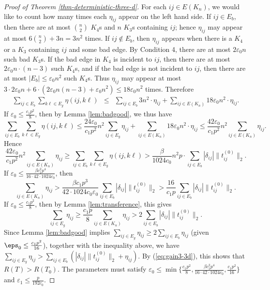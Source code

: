 \begin{proof}[Proof of Theorem \ref{thm-deterministic-three-d}]
For each $ij\in E(K_{n})$, we would like to count how many times
each $\eta_{ij}$ appear on the left hand side. If $ij\in E_{b}$,
then there are at most ${n \choose 2}$ $K_{4}$s and $n$ $K_{3}$s
containing $ij$; hence $\eta_{ij}$ may appear at most $6{n \choose 2}+3n=3n^{2}$
times. If $ij\notin E_{b}$, then $\eta_{ij}$ appears when there
is a $K_{4}$ or a $K_{3}$ containing $ij$ and some bad edge. By
Condition 4, there are at most $2\varepsilon_{0}n$ such bad $K_{3}$s.
If the bad edge in $K_{4}$ is incident to $ij$, then there are at
most $2\varepsilon_{0}n\cdot(n-3)$ such $K_{4}$s, and if the bad
edge is not incident to $ij$, then there are at most $|E_{b}|\le\varepsilon_{0}n^{2}$
such $K_{4}$s. Thus $\eta_{ij}$ may appear at most $3\cdot2\varepsilon_{0}n+6\cdot(2\varepsilon_{0}n(n-3)+\varepsilon_{0}n^{2})\le18\varepsilon_{0}n^{2}$
times. Therefore
\begin{eqnarray*}
\sum_{ij\in E_{b}}\sum_{k\ell\in E_{g}}\eta(ij,k\ell) & \le & \sum_{ij\in E_{b}}3n^{2}\cdot\eta_{ij}+\sum_{ij\in E(K_{n})}18\varepsilon_{0}n^{2}\cdot\eta_{ij}.
\end{eqnarray*}
If $\varepsilon_0 \le \frac{c_1p^2}{8}$, then by Lemma \ref{lem:badgood}, we thus have
\[
\sum_{ij\in E_{b}}\sum_{k\ell\in E_{g}}\eta(ij,k\ell)\le\frac{24\varepsilon_{0}}{c_{1}p^{2}}n^{2}\sum_{ij\in E_{g}}\eta_{ij}+\sum_{ij\in E(K_{n})}18\varepsilon_{0}n^{2}\cdot\eta_{ij}\le\frac{42\varepsilon_{0}}{c_{1}p^{2}}n^{2}\sum_{ij\in E(K_{n})}\eta_{ij}.
\]
Hence
\[
	\frac{42\varepsilon_{0}}{c_{1}p^{2}}n^{2}\sum_{ij\in E(K_{n})}\eta_{ij}
	\ge \sum_{ij\in E_{b}}\sum_{k\ell\in E_{g}}\eta(ij,k\ell) 
	> \frac{\beta}{1024c_{0}}n^{2}p\cdot\sum_{ij\in E_{b}}|\delta_{ij}|\|t_{ij}^{(0)}\|_2.
\]
If $\varepsilon_{0}\le\frac{\beta c_{1}^{2}p^{4}}{16 \cdot 42 \cdot 1024 c_{0}}$, then
\[
	\sum_{ij\in E(K_{n})}\eta_{ij}
	> \frac{\beta c_{1}p^{3}}{42\cdot1024c_{0}\varepsilon_{0}}\sum_{ij\in E_{b}}|\delta_{ij}|\|t_{ij}^{(0)}\|_2
	> \frac{16}{c_{1}p}\sum_{ij\in E_{b}}|\delta_{ij}|\|t_{ij}^{(0)}\|_2.
\]
If $\varepsilon_0 \le \frac{c_1p^2}{8}$, then by Lemma \ref{lem:transference}, this gives 
\[
	\sum_{ij\in E_{g}}\eta_{ij}\ge\frac{c_{1}p}{8}\sum_{ij\in E(K_{n})}\eta_{ij} 
	> 2\sum_{ij\in E_{b}}|\delta_{ij}|\|t_{ij}^{(0)}\|_2.
\]
Since Lemma \ref{lem:badgood} implies $\sum_{ij\in E_{g}}\eta_{ij}\ge 2 \sum_{ij\in E_{b}}\eta_{ij}$ 
(given $\eps_0 \leq \frac{c_1 p^2}{16}$), 
together with the inequality above, we have $\sum_{ij\in E_{g}}\eta_{ij}>\sum_{ij\in E_{b}}(|\delta_{ij}|\|t_{ij}^{(0)}\|_2+\eta_{ij})$.
By (\ref{eq:gain3-3d}), this shows that $R(T)>R(T_{0})$. 
The parameters must satisfy $\varepsilon_0 \le \min \{\frac{c_1p^2}{8}, \frac{\beta c_1^2 p^4}{16 \cdot 42 \cdot 1024 c_0}, \frac{c_1p^2}{16} \}$ and $\varepsilon_1 \le \frac{p}{192c_0}$.


\end{proof}
